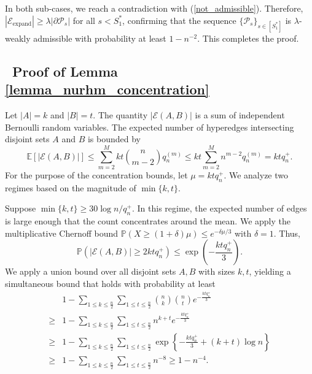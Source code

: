 \documentclass[
  12pt]{article}
\begin{document}
In both sub-cases, we reach a contradiction with (\ref{not_admissible}). Therefore, $|\mathcal{E}_{\operatorname{expand}}| \geq \lambda |\partial \mathcal{P}_s|$ for all $s < S_1^*$, confirming that the sequence $\{\mathcal{P}_s\}_{s \in [S_1^*]}$ is $\lambda$-weakly admissible with probability at least $1-n^{-2}$. This completes the proof.


\subsection{~Proof of Lemma \ref{lemma_nurhm_concentration}}

Let $|A|=k$ and $|B|=t$. The quantity $|\mathcal{E}(A, B)|$ is a sum of independent Bernoulli random variables. The expected number of hyperedges intersecting disjoint sets $A$ and $B$ is bounded by
$$
\mathbb{E}[|\mathcal{E}(A, B)|] \leq \sum_{m=2}^M k t \binom{n}{m-2} q_n^{(m)} \leq k t \sum_{m=2}^M n^{m-2} q_n^{(m)} = k t q_{n}^{+}.
$$
For the purpose of the concentration bounds, let $\mu = k t q_{n}^{+}$. We analyze two regimes based on the magnitude of $\min \{k, t\}$.

Suppose $\min \{k, t\} \geq 30 \log n/q_{n}^{+}$. In this regime, the expected number of edges is large enough that the count concentrates around the mean. We apply the multiplicative Chernoff bound $\mathbb{P}(X \geq (1+\delta)\mu) \leq e^{-\delta \mu / 3}$ with $\delta=1$. Thus,
$$
\mathbb{P}(|\mathcal{E}(A, B)| \geq 2 k t q_{n}^{+}) \leq \exp\left(-\frac{k t q_{n}^{+}}{3}\right).
$$
We apply a union bound over all disjoint sets $A, B$ with sizes $k, t$, yielding a simultaneous bound that holds with probability at least
$$
\begin{aligned}
& 1-\sum_{1 \leq k \leq \frac{n}{2}} \sum_{1 \leq t \leq \frac{n}{2}} \binom{n}{k}\binom{n}{t} e^{-\frac{k t q_{n}^{+}}{3}} \\
\geq & 1-\sum_{1 \leq k \leq \frac{n}{2}} \sum_{1 \leq t \leq \frac{n}{2}} n^{k+t} e^{-\frac{k t q_{n}^{+}}{3}} \\
\geq & 1-\sum_{1 \leq k \leq \frac{n}{2}} \sum_{1 \leq t \leq \frac{n}{2}} \exp \left\{-\frac{k t q_{n}^{+}}{3}+(k+t) \log n\right\} \\
\geq & 1-\sum_{1 \leq k \leq \frac{n}{2}} \sum_{1 \leq t \leq \frac{n}{2}} n^{-8} \geq  1-n^{-4} .
\end{aligned}
$$
\end{document}
